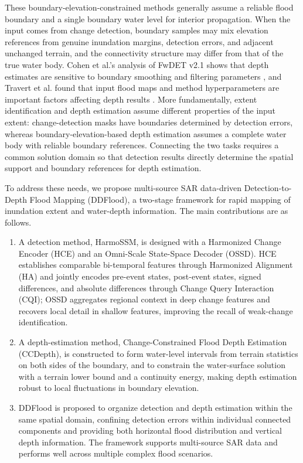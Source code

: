 \documentclass[authoryear,preprint,12pt]{elsarticle}
\begin{document}
These boundary-elevation-constrained methods generally assume a reliable flood boundary and a single boundary water level for interior propagation. When the input comes from change detection, boundary samples may mix elevation references from genuine inundation margins, detection errors, and adjacent unchanged terrain, and the connectivity structure may differ from that of the true water body. Cohen et al.'s analysis of FwDET v2.1 shows that depth estimates are sensitive to boundary smoothing and filtering parameters \citep{cohen2022sensitivity}, and Travert et al. found that input flood maps and method hyperparameters are important factors affecting depth results \citep{travert2026uncertainty}. More fundamentally, extent identification and depth estimation assume different properties of the input extent: change-detection masks have boundaries determined by detection errors, whereas boundary-elevation-based depth estimation assumes a complete water body with reliable boundary references. Connecting the two tasks requires a common solution domain so that detection results directly determine the spatial support and boundary references for depth estimation.

To address these needs, we propose multi-source SAR data-driven Detection-to-Depth Flood Mapping (DDFlood), a two-stage framework for rapid mapping of inundation extent and water-depth information. The main contributions are as follows.

\begin{enumerate}
\item A detection method, HarmoSSM, is designed with a Harmonized Change Encoder (HCE) and an Omni-Scale State-Space Decoder (OSSD). HCE establishes comparable bi-temporal features through Harmonized Alignment (HA) and jointly encodes pre-event states, post-event states, signed differences, and absolute differences through Change Query Interaction (CQI); OSSD aggregates regional context in deep change features and recovers local detail in shallow features, improving the recall of weak-change identification.

\item A depth-estimation method, Change-Constrained Flood Depth Estimation (CCDepth), is constructed to form water-level intervals from terrain statistics on both sides of the boundary, and to constrain the water-surface solution with a terrain lower bound and a continuity energy, making depth estimation robust to local fluctuations in boundary elevation.

\item DDFlood is proposed to organize detection and depth estimation within the same spatial domain, confining detection errors within individual connected components and providing both horizontal flood distribution and vertical depth information. The framework supports multi-source SAR data and performs well across multiple complex flood scenarios.

\end{enumerate}
\end{document}
